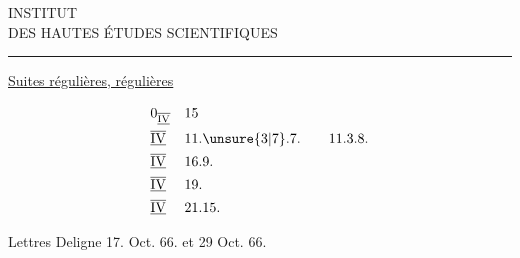 
\begin{center}
INSTITUT\\
DES HAUTES ÉTUDES SCIENTIFIQUES\\
\rule{1.4cm}{0.4pt}
\end{center}

\uline{Suites régulières,  régulières}

\[
\begin{aligned}
&0_{\overline{\underline{\mathrm{IV}}}} &&15\\
&\overline{\underline{\mathrm{IV}}} &&11.\unsure{3|7}.7.\qquad 11.3.8.\\
&\overline{\underline{\mathrm{IV}}} &&16.9.\\
&\overline{\underline{\mathrm{IV}}} &&19.\\
&\overline{\underline{\mathrm{IV}}} &&21.15.
\end{aligned}
\]

Lettres Deligne 17. Oct. 66. et 29 Oct. 66.

